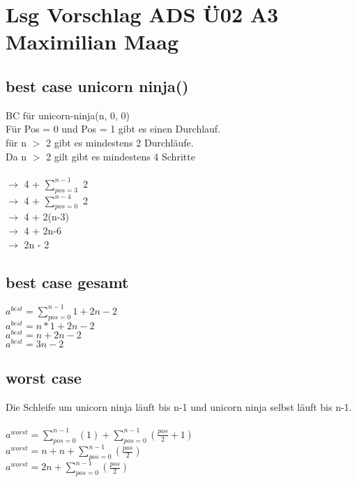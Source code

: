 \documentclass{article}
\begin{document}
	\section*{Lsg Vorschlag ADS Ü02 A3 Maximilian Maag}
	\subsection*{best case unicorn ninja()}
	BC für unicorn-ninja(n, 0, 0) \\
	Für Pos = 0 und Pos = 1 gibt es einen Durchlauf. \\
	für n $>$ 2 gibt es mindestens 2 Durchläufe. \\
	Da n $>$ 2 gilt gibt es mindestens 4 Schritte \\ \\
	$\to$ 4 + $\sum_{pos=3}^{n-1}$ 2 \\
	$\to$ 4 + $\sum_{pos=0}^{n-4}$ 2 \\
	$\to$ 4 + 2(n-3) \\
	$\to$ 4 + 2n-6 \\
	$\to$ 2n - 2 \\
	\subsection*{best case gesamt}
	$a^{best} =  \sum_{pos=0}^{n-1} 1 + 2n - 2$ \\
	$a^{best} =  n*1 + 2n - 2$ \\
	$a^{best} =  n + 2n - 2$ \\
	$a^{best} =  3n - 2$ \\
	\subsection*{worst case}
	Die Schleife um unicorn ninja läuft bis n-1 und unicorn ninja selbst läuft bis n-1. \\ \\
	$a^{worst} =  \sum_{pos=0}^{n-1}(1)+\sum_{pos=0}^{n-1}(\frac{pos}{2}+1)$ \\
	$a^{worst} = n+n+\sum_{pos=0}^{n-1}(\frac{pos}{2})$ \\
	$a^{worst} = 2n+\sum_{pos=0}^{n-1}(\frac{pos}{2})$ \\
\end{document}
